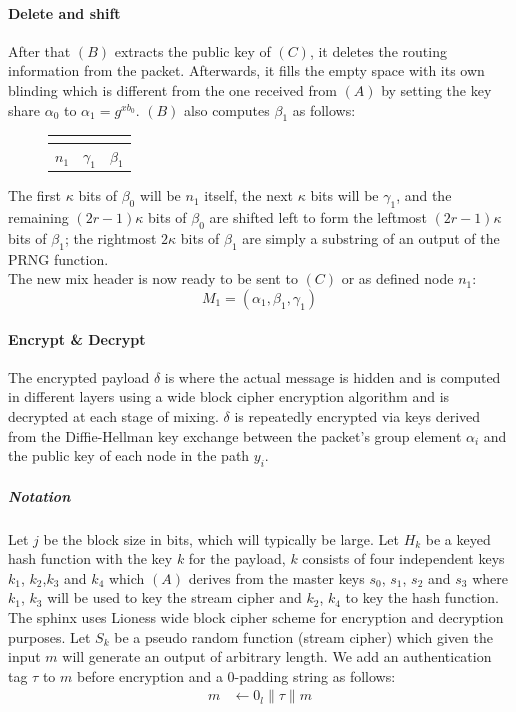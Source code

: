 \paragraph{Delete and shift}
After that $(B)$ extracts the public key of $(C)$, it deletes the routing information from the packet. Afterwards, it fills the empty space with its own blinding which is different from the one received from $(A)$ by setting the key share $\alpha_0$ to $\alpha_1=g^{xb_0}$. $(B)$ also computes $\beta_1$ as follows:
\begin{figure}[H]
    \centering

           \begin{tabular}{| m{} | m{} | m{} |}
            \hline
            \multicolumn{3}{|c|}{\centering{$\beta_0$}}\\
            \hline
            $n_{1}$ & $\gamma_{1}$& $\beta_{1}$ \\
           \hline
           \end{tabular}                   
    \end{figure}
\hspace{-5mm}The first $\kappa$ bits of $\beta_0$ will be $n_{1}$ itself, the next $\kappa$ bits will be $\gamma_{1}$, and the remaining $(2r-1)\kappa$ bits of $\beta_0$ are shifted left to form the leftmost $(2r-1)\kappa$ bits of $\beta_{1}$; the rightmost $2\kappa$ bits of $\beta_{1}$ are simply a substring of an output of the PRNG function.
\\The new mix header is now ready to be sent to $(C)$ or as defined node $n_1$:  
$$M_1=(\alpha_1,\beta_1,\gamma_1)$$
\paragraph{Encrypt \& Decrypt}
The encrypted payload $\delta$ is where the actual message is hidden and is computed in different layers using a wide block cipher encryption algorithm and is decrypted at each stage of mixing.
$\delta$ is repeatedly encrypted via keys derived from the Diffie-Hellman key exchange between the packet’s group element $\alpha_i$ and the public key of each node in the path $y_i$. 
 
\subparagraph{Notation}
Let $j$ be the block size in bits, which will typically be large. Let $H_k$ be a keyed hash function with the key $k$ for the payload, $k$ consists of four independent keys $k_1$, $k_2$,$k_3$ and $k_4$ which $(A)$ derives from the master keys $s_0$, $s_1$, $s_2$ and $s_3$ where $k_1$, $k_3$ will be used to key the stream cipher and $k_2$, $k_4$ to key the hash function. The sphinx uses Lioness wide block cipher scheme for encryption and decryption purposes.
Let $S_k$ be a pseudo random function (stream cipher) which given the input $m$ will generate an output of arbitrary length. We add an authentication tag $\tau$ to $m$ before encryption and a 0-padding string as follows: 
\begin{align}  
   m &\leftarrow 0_{l} \|\tau\|m
    \end{align}

